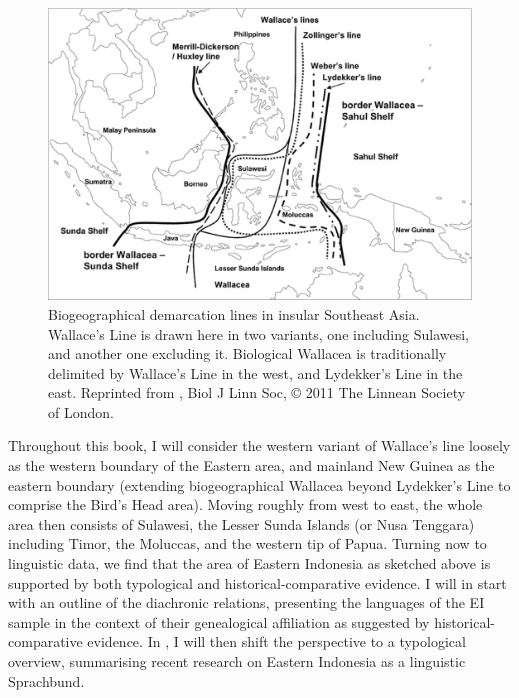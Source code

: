 \begin{figure}

\includegraphics[width=1.0\textwidth]{figures/Wallacea2.eps}
\caption[Biogeographical demarcation lines in insular Southeast Asia]{Biogeographical demarcation lines in insular Southeast Asia. Wallace's Line is drawn here in two variants, one including Sulawesi, and another one excluding it. Biological Wallacea is traditionally delimited by Wallace's Line in the west, and Lydekker's Line in the east. Reprinted from \citealt{Welzen2011}, Biol J Linn Soc, © 2011 The Linnean Society of London.}\label{map:wallacea}

\end{figure}

\newpage
Throughout this book, I will consider the western variant of Wallace's line loosely as the western boundary of the Eastern  area, and mainland New Guinea as the eastern boundary (extending biogeographical Wallacea beyond Lydekker's Line to comprise the Bird's Head area). Moving roughly from west to east, the whole area then consists of Sulawesi, the Lesser Sunda Islands (or Nusa Tenggara) including Timor, the Moluccas, and the western tip of  Papua. Turning now to linguistic data, we find that the area of Eastern Indonesia as sketched above is supported by both typological and historical-comparative evidence. I will in  start with an outline of the diachronic relations, presenting the languages of the EI sample in the context of their genealogical affiliation as suggested by historical-comparative evidence. In , I will then shift the perspective to a typological overview, summarising recent research on Eastern Indonesia as a linguistic Sprachbund. 

